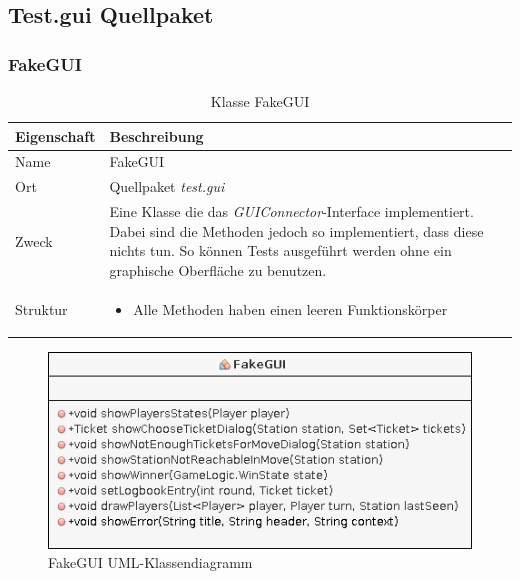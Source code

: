 \subsection{Test.gui Quellpaket}
    \subsubsection{FakeGUI}
        \begin{table}[H]
            \caption{Klasse FakeGUI}
            \begin{tabular}{p{2.5cm}  p{9.5cm}} 
                \hline
                \textbf{Eigenschaft} & \textbf{Beschreibung}\\
                \hline
                Name & FakeGUI\\
                Ort & Quellpaket \textit{test.gui}\\
                \hline
                Zweck &
                Eine Klasse die das \textit{GUIConnector}-Interface implementiert. Dabei sind die Methoden jedoch so implementiert,
                dass diese nichts tun. So können Tests ausgeführt werden ohne ein graphische Oberfläche zu benutzen.
                \\
                \hline
                Struktur &
                \begin{itemize}
                    \itemsep0em
                    \item Alle Methoden haben einen leeren Funktionskörper
                \end{itemize}
                \\
                \hline
            \end{tabular}
        \end{table}
        \begin{figure}[H]
            \centering
            \includegraphics[scale=0.6]{img/uml/fakeGUI.png}   
            \caption{FakeGUI UML-Klassendiagramm}
        \end{figure}